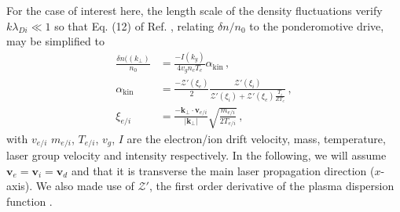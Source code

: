 \documentclass[%
 reprint,
 amsmath,amssymb,
 aps,
]{revtex4-1}
\begin{document}
For the case of interest here,  the length scale of the density fluctuations verify   $k\lambda_{Di} \ll 1 $ so that Eq. (12) of Ref.  \cite{POF_Drake_1973},  relating $\delta n /n_0$ to the ponderomotive  drive,   may be simplified to 
 \begin{align}
 \frac{ \delta n((k_\perp) }{n_0}  &=   \frac{ - I(k_y) }{ 4 v_g n_c T_e }  \alpha_ \mathrm{kin}    \, , \nonumber \\
 \alpha_ \mathrm{kin}    & = \frac{-\mathcal{Z}'( \xi_e) }{2}\frac{\mathcal{Z}'( \xi_i)   }{  \mathcal{Z}'( \xi_i) +\mathcal{Z}'( \xi_e)\frac{ T_i }{  ZT_e} } \, ,\label{eq:drakef}
 \\
\xi_{e/i} &=  \frac{-\mathbf{k}_\perp\cdot\mathbf{v}_{e/i} }{\vert \mathbf{k}_\perp \vert } \sqrt{ \frac{ m_{e/i} }{ 2T_{e/i} }  }   \label{eq:xi} \, , 
\end{align}
with $ v_{e/i}$ $ m_{e/i}$, $T_{e/i}$, $v_g$, $I$ are the electron/ion drift velocity, mass, temperature, laser group velocity and intensity respectively. In the following,  we will assume  $\mathbf{v}_e=\mathbf{v}_i=\mathbf{v}_d$ and that it is transverse the main laser propagation direction ($x$-axis). We also made use of $\mathcal{Z}'$, the first order derivative of the plasma dispersion function \cite{Fried_Gell-Mann_1960}.
\end{document}

